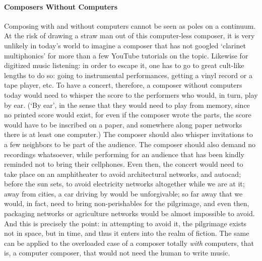 \paragraph{Composers Without Computers}

Composing with and without computers cannot be seen as poles on a continuum. At the risk of drawing a straw man out of this computer-less composer, it is very unlikely in today's world to imagine a composer that has not googled `clarinet multiphonics' for more than a few YouTube tutorials on the topic. Likewise for digitized music listening: in order to escape it, one has to go to great cult-like lengths to do so: going to instrumental performances, getting a vinyl record or a tape player, etc. To have a concert, therefore, a composer without computers today would need to whisper the score to the performers who would, in turn, play by ear. (`By ear', in the sense that they would need to play from memory, since no printed score would exist, for even if the composer wrote the parts, the score would have to be inscribed on a paper, and somewhere along paper networks there is at least one computer.) The composer should also whisper invitations to a few neighbors to be part of the audience. The composer should also demand no recordings whatsoever, while performing for an audience that has been kindly reminded not to bring their cellphones. Even then, the concert would need to take place on an amphitheater to avoid architectural networks, and \gls{autocad}; before the sun sets, to avoid electricity networks altogether while we are at it; away from cities, a car driving by would be unforgivable; so far away that we would, in fact, need to bring non-perishables for the pilgrimage, and even then, packaging networks or agriculture networks would be almost impossible to avoid. And this is precisely the point: in attempting to avoid it, the pilgrimage exists not in space, but in time, and thus it enters into the realm of fiction. The same can be applied to the overloaded case of a composer totally \textit{with} computers, that is, a computer composer, that would not need the human to write music. 

